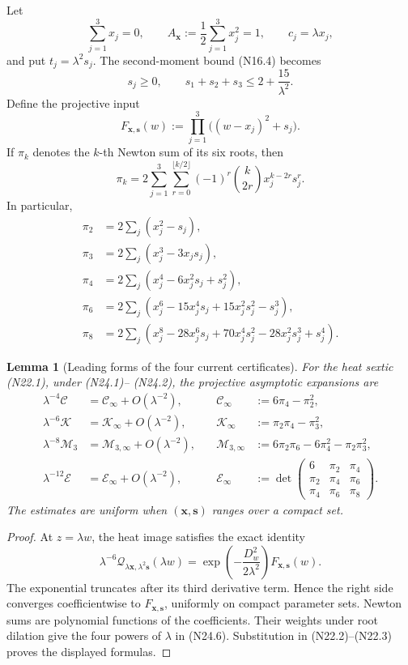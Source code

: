 \documentclass[11pt]{article}
\newtheorem{lemma}[theorem]{Lemma}
\theoremstyle{definition}
\theoremstyle{remark}
\begin{document}
Let
\[
 \sum_{j=1}^3x_j=0,\qquad
 A_{\bm x}:=\frac12\sum_{j=1}^3x_j^2=1,
 \qquad c_j=\lambda x_j,
 \tag{N24.1}
\]
and put \(t_j=\lambda^2s_j\).  The second-moment bound
\textup{(N16.4)} becomes
\[
 s_j\geq0,\qquad
 s_1+s_2+s_3\leq2+\frac{15}{\lambda^2}.
 \tag{N24.2}
\]
Define the projective input
\[
 F_{\bm x,\bm s}(w)
 :=\prod_{j=1}^3\bigl((w-x_j)^2+s_j\bigr).
 \tag{N24.3}
\]
If \(\pi_k\) denotes the \(k\)-th Newton sum of its six roots, then
\[
 \pi_k=2\sum_{j=1}^3
 \sum_{r=0}^{\lfloor k/2\rfloor}
 (-1)^r\binom{k}{2r}x_j^{k-2r}s_j^r.
 \tag{N24.4}
\]
In particular,
\[
\begin{aligned}
 \pi_2&=2\sum_j(x_j^2-s_j),\\
 \pi_3&=2\sum_j(x_j^3-3x_js_j),\\
 \pi_4&=2\sum_j(x_j^4-6x_j^2s_j+s_j^2),\\
 \pi_6&=2\sum_j(x_j^6-15x_j^4s_j
              +15x_j^2s_j^2-s_j^3),\\
 \pi_8&=2\sum_j(x_j^8-28x_j^6s_j+70x_j^4s_j^2
              -28x_j^2s_j^3+s_j^4).
\end{aligned}
\tag{N24.5}
\]

\begin{lemma}[Leading forms of the four current certificates]
\label{lem:f2v24-leading-forms}
For the heat sextic \textup{(N22.1)}, under \textup{(N24.1)}--
\textup{(N24.2)}, the projective asymptotic expansions are
\[
\begin{aligned}
 \lambda^{-4}\mathcal C&=\mathcal C_\infty+O(\lambda^{-2}),
 &\quad \mathcal C_\infty&:=6\pi_4-\pi_2^2,\\
 \lambda^{-6}\mathcal K&=\mathcal K_\infty+O(\lambda^{-2}),
 &\quad \mathcal K_\infty&:=\pi_2\pi_4-\pi_3^2,\\
 \lambda^{-8}\mathcal M_3&=\mathcal M_{3,\infty}+O(\lambda^{-2}),
 &\quad \mathcal M_{3,\infty}&:=
 6\pi_2\pi_6-6\pi_4^2-\pi_2\pi_3^2,\\
 \lambda^{-12}\mathcal E&=\mathcal E_\infty+O(\lambda^{-2}),
 &\quad \mathcal E_\infty&:=
 \det\!\begin{pmatrix}
 6&\pi_2&\pi_4\\
 \pi_2&\pi_4&\pi_6\\
 \pi_4&\pi_6&\pi_8
 \end{pmatrix}.
\end{aligned}
\tag{N24.6}
\]
The estimates are uniform when
\((\bm x,\bm s)\) ranges over a compact set.
\end{lemma}

\begin{proof}
At \(z=\lambda w\), the heat image satisfies the exact identity
\[
 \lambda^{-6}\mathcal Q_{\lambda\bm x,\lambda^2\bm s}
 (\lambda w)
 =\exp\!\left(-\frac{D_w^2}{2\lambda^2}\right)
 F_{\bm x,\bm s}(w).
 \tag{N24.7}
\]
The exponential truncates after its third derivative term.  Hence the
right side converges coefficientwise to \(F_{\bm x,\bm s}\), uniformly
on compact parameter sets.  Newton sums are polynomial functions of the
coefficients.  Their weights under root dilation give the four powers of
\(\lambda\) in \textup{(N24.6)}.  Substitution in
\textup{(N22.2)}--\textup{(N22.3)} proves the displayed formulas.
\end{proof}
\end{document}
